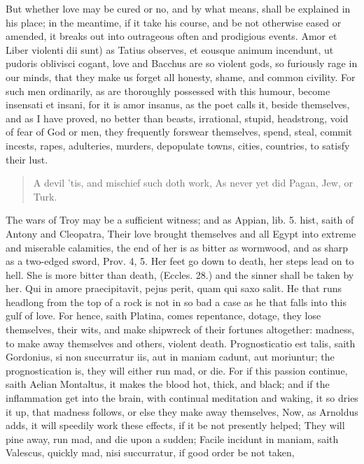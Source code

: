 But whether love may be cured or no, and by what means, shall be
explained in his place; in the meantime, if it take his course, and be
not otherwise eased or amended, it breaks out into outrageous often and
prodigious events. Amor et Liber violenti dii sunt) as Tatius
observes, et eousque animum incendunt, ut pudoris oblivisci cogant,
love and Bacchus are so violent gods, so furiously rage in our minds,
that they make us forget all honesty, shame, and common civility. For
such men ordinarily, as are thoroughly possessed with this humour,
become insensati et insani, for it is amor insanus, as the poet
calls it, beside themselves, and as I have proved, no better than
beasts, irrational, stupid, headstrong, void of fear of God or men,
they frequently forswear themselves, spend, steal, commit incests,
rapes, adulteries, murders, depopulate towns, cities, countries, to
satisfy their lust.

\begin{verse}%
A devil 'tis, and mischief such doth work,
As never yet did Pagan, Jew, or Turk.
\end{verse}%

The wars of Troy may be a sufficient witness; and as Appian, lib. 5.
hist, saith of Antony and Cleopatra, Their love brought
themselves and all Egypt into extreme and miserable calamities, the end
of her is as bitter as wormwood, and as sharp as a two-edged sword,
Prov.  4, 5. Her feet go down to death, her steps lead on to hell.
She is more bitter than death, (Eccles.  28.) and the sinner shall
be taken by her. Qui in amore praecipitavit, pejus perit, quam
qui saxo salit. He that runs headlong from the top of a rock is
not in so bad a case as he that falls into this gulf of love. For
hence, saith  Platina, comes repentance, dotage, they lose
themselves, their wits, and make shipwreck of their fortunes
altogether: madness, to make away themselves and others, violent death.
Prognosticatio est talis, saith Gordonius, si non succurratur
iis, aut in maniam cadunt, aut moriuntur; the prognostication is, they
will either run mad, or die. For if this passion continue, saith
Aelian Montaltus, it makes the blood hot, thick, and black; and
if the inflammation get into the brain, with continual meditation and
waking, it so dries it up, that madness follows, or else they make away
themselves,  Now, as
Arnoldus adds, it will speedily work these effects, if it be not
presently helped; They will pine away, run mad, and die upon a
sudden; Facile incidunt in maniam, saith Valescus, quickly mad, nisi
succurratur, if good order be not taken,

